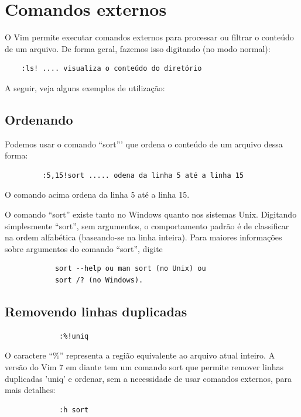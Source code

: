 \documentclass[10pt,a4paper,openany]{book}
\begin{document}
\chapter{Comandos externos}
O Vim permite executar comandos externos para processar ou filtrar o
conteúdo de um arquivo. De forma geral, fazemos isso digitando (no
modo normal):

\begin{verbatim}
   	:ls! .... visualiza o conteúdo do diretório
\end{verbatim}

A seguir, veja alguns exemplos de utilização:

\section{Ordenando}
Podemos usar o comando ``sort''' que ordena o conteúdo de um arquivo dessa forma:

\begin{verbatim}
		 :5,15!sort ..... odena da linha 5 até a linha 15
\end{verbatim}

O comando acima ordena da linha 5 até a linha 15.

O comando ``sort'' existe tanto no Windows quanto nos sistemas Unix.
Digitando simplesmente ``sort'', sem argumentos, o comportamento padrão
é de classificar na ordem alfabética (baseando-se na linha inteira).
Para maiores informações sobre argumentos do comando ``sort'', digite

\begin{verbatim}
			sort --help ou man sort (no Unix) ou
			sort /? (no Windows).
\end{verbatim}

\section{Removendo linhas duplicadas}

\begin{verbatim}
			 :%!uniq
\end{verbatim}

O caractere ``\%'' representa a região equivalente ao
arquivo atual inteiro.  A versão do Vim 7 em diante tem um comando sort que permite
remover linhas duplicadas 'uniq' e ordenar, sem a necessidade
de usar comandos externos, para mais detalhes:

\begin{verbatim}
			 :h sort
\end{verbatim}
\end{document}
